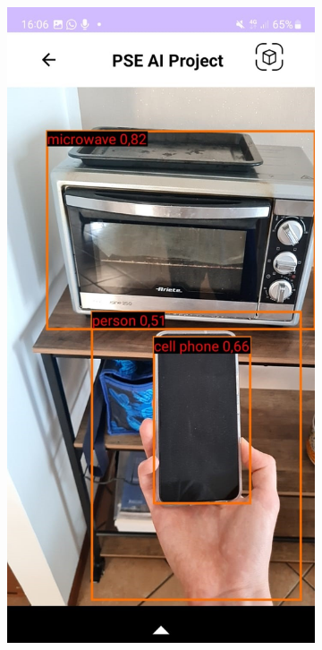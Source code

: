 \begin{figure}[ht]
    \centering
    \begin{subfigure}[b]{0.3\textwidth}
      \includegraphics[width=\textwidth, height=0.45\textheight]{Immagini/App/funzionamento_3rettangoli.jpeg}

\end{subfigure}
\end{figure}
